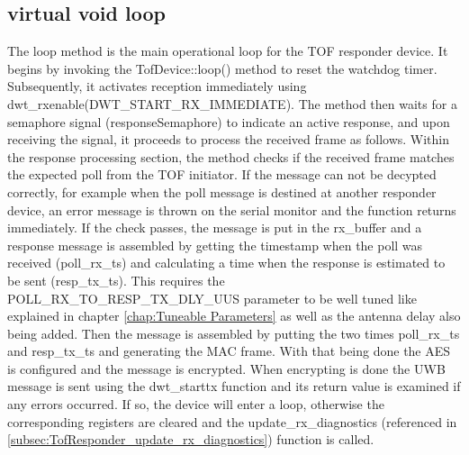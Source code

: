 \subsection{virtual void loop}
\label{subsec:TofResponder_loop}
The loop method is the main operational loop for the TOF responder device. 
It begins by invoking the TofDevice::loop() method to reset the watchdog timer. 
Subsequently, it activates reception immediately using dwt\_rxenable(DWT\_START\_RX\_IMMEDIATE). 
The method then waits for a semaphore signal (responseSemaphore) to indicate an active response, and upon receiving the signal, it proceeds to process the received frame as follows.
\vspace{4pt}
\newline
Within the response processing section, the method checks if the received frame matches the expected poll from the TOF initiator. 
If the message can not be decypted correctly, for example when the poll message is destined at another responder device, an error message is thrown on the serial monitor and the function returns immediately. 
\vspace{4pt}
\newline
If the check passes, the message is put in the rx\_buffer and a response message is assembled by getting the timestamp when the poll was received (poll\_rx\_ts) and calculating a time when the response is estimated to be sent (resp\_tx\_ts). 
This requires the POLL\_RX\_TO\_RESP\_TX\_DLY\_UUS parameter to be well tuned like explained in chapter \ref{chap:Tuneable Parameters} as well as the antenna delay also being added. 
\vspace{4pt}
\newline
Then the message is assembled by putting the two times poll\_rx\_ts and resp\_tx\_ts and generating the MAC frame. 
With that being done the AES is configured and the message is encrypted. 
When encrypting is done the UWB message is sent using the dwt\_starttx function and its return value is examined if any errors occurred. 
If so, the device will enter a loop, otherwise the corresponding registers are cleared and the update\_rx\_diagnostics (referenced in \ref{subsec:TofResponder_update_rx_diagnostics}) function is called. 

